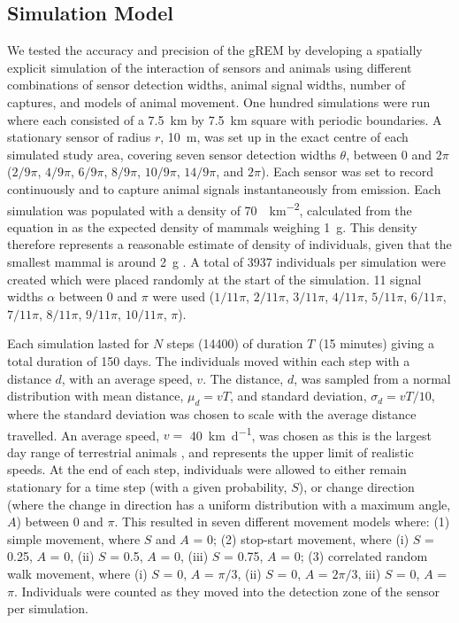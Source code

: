 \documentclass[a4paper,10pt,reqno,oneside]{amsart}
\begin{document}
\subsection*{Simulation Model}

We tested the accuracy and precision of the gREM by developing a spatially explicit simulation of the interaction of sensors and animals using different combinations of sensor detection widths, animal signal widths, number of captures, and models of animal movement. One hundred simulations were run where each consisted of a  \SI{7.5}{\kilo\meter} by \SI{7.5}{\kilo\meter} square with periodic boundaries. A stationary sensor of radius $r$, \SI{10}{\meter}, was set up in the exact centre of each simulated study area, covering seven sensor detection widths $\theta$, between 0 and $2\pi$ ($2/9\pi$, $4/9\pi$, $6/9\pi$, $8/9\pi$, $10/9\pi$, $14/9\pi$, and $2\pi$). Each sensor was set to record continuously and to capture animal signals instantaneously from emission. Each simulation was populated with a density of \SI{70}{\animals\per\kilo\meter\squared}, calculated from the equation in \cite{damuth1981population} as the expected density of mammals weighing \SI{1}{\gram}. This density therefore represents a reasonable estimate of density of individuals, given that the smallest mammal is around \SI{2}{\gram} \citep{jones2009pantheria}. A total of 3937 individuals per simulation were created which were placed randomly at the start of the simulation. 11 signal widths $\alpha$ between 0 and $\pi$ were used ($1/11\pi$, $2/11\pi$, $3/11\pi$, $4/11\pi$, $5/11\pi$, $6/11\pi$, $7/11\pi$, $8/11\pi$, $9/11\pi$, $10/11\pi$, $\pi$). 

Each simulation lasted for $N$ steps (14400) of duration $T$ (15 minutes) giving a total duration of 150 days. The individuals moved within each step with a distance $d$, with an average speed, $v$. The distance, $d$, was sampled from a normal distribution with mean distance, $\mu_d = vT$, and standard deviation, $\sigma_d = vT/10$, where the standard deviation was chosen to scale with the average distance travelled. An average speed, $v = $ \SI{40}{\kilo\meter \per \day}, was chosen as this is the largest day range of terrestrial animals \citep{carbone2005far}, and represents the upper limit of realistic speeds. At the end of each step, individuals were allowed to either remain stationary for a time step (with a given probability, $S$), or change direction (where the change in direction has a uniform distribution with a maximum angle, $A$) between 0 and $\pi$. This resulted in seven different movement models where: (1) simple movement, where $S$ and $A$ = 0; (2) stop-start movement, where (i) $S$ = 0.25, $A$ = 0, (ii) $S$ = 0.5, $A$ = 0, (iii) $S$ = 0.75, $A$ = 0; (3) correlated random walk movement, where (i) $S$ = 0, $A$ = $\pi/3$, (ii) $S$ = 0, $A$ = $2\pi/3$, iii) $S$ = 0, $A$ = $\pi$. Individuals were counted as they moved into the detection zone of the sensor per simulation. 
\end{document}
